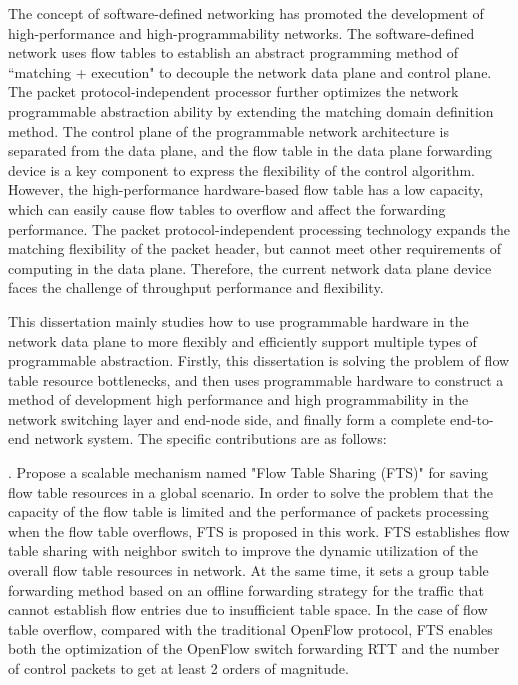 %
\noindent The concept of software-defined networking has promoted the development of high-performance and high-programmability networks.
The software-defined network uses flow tables to establish an abstract programming method of ``matching + execution" to decouple the network data plane and control plane.
The packet protocol-independent processor further optimizes the network programmable abstraction ability by extending the matching domain definition method.
The control plane of the programmable network architecture is separated from the data plane, and the flow table in the data plane forwarding device is a key component to express the flexibility of the control algorithm. 
However, the high-performance hardware-based flow table has a low capacity, which can easily cause flow tables to overflow and affect the forwarding performance.
The packet protocol-independent processing technology expands the matching flexibility of the packet header, but cannot meet other requirements of computing in the data plane. 
Therefore, the current network data plane device faces the challenge of throughput performance and flexibility.\newline

\noindent This dissertation mainly studies how to use programmable hardware in the network data plane to more flexibly and efficiently support multiple types of programmable abstraction.
Firstly, this dissertation is solving the problem of flow table resource bottlenecks, and then uses programmable hardware to construct a method of development high performance and high programmability in the network switching layer and end-node side, and finally form a complete end-to-end network system.
The specific contributions are as follows:\newline


. Propose a scalable mechanism named "Flow Table Sharing (FTS)" for saving flow table resources in a global scenario.
In order to solve the problem that the capacity of the flow table is limited and the performance of packets processing when the flow table overflows, FTS is proposed in this work.
FTS establishes flow table sharing with neighbor switch to improve the dynamic utilization of the overall flow table resources in network. At the same time, it sets a group table forwarding method based on an offline forwarding strategy for the traffic that cannot establish flow entries due to insufficient table space.
In the case of flow table overflow, compared with the traditional OpenFlow protocol, FTS enables both the optimization of the OpenFlow switch forwarding RTT and the number of control packets to get at least 2 orders of magnitude.\newline

